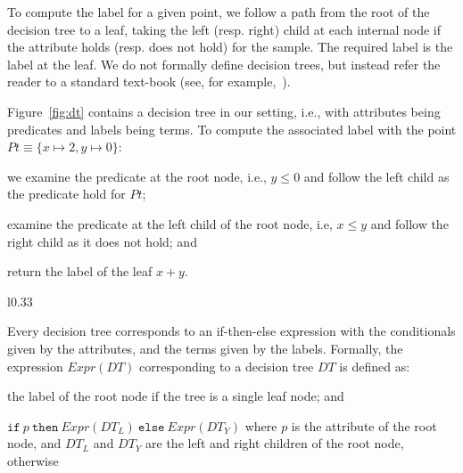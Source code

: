 \documentclass{llncs}
\newcommand\Point{\mathit{Pt}}
\newcommand\Pred{p}
\newcommand\ITE[3]{\mathtt{if}~#1~\mathtt{then}~#2~\mathtt{else}~#3}
\newcommand\DecisionTree{\mathit{DT}}
\newcommand\DTtoExpr[1]{\mathit{Expr}(#1)}
\newcommand\node{v}
\begin{document}
To compute the label for a given point, we follow a path from the root
of the decision tree to a leaf, taking the left (resp. right) child at
each internal node if the attribute holds (resp.  does not hold) for the
sample.
The required label is the label at the leaf.
We do not formally define decision trees, but instead refer the reader
to a standard text-book (see, for example,~\cite{bishop-book}).

\begin{example}
  Figure~\ref{fig:dt} contains a decision tree in our setting, i.e.,
  with attributes being predicates and labels being terms.
  To compute the associated label with the point $\Point \equiv \{ x
  \mapsto 2, y \mapsto 0 \}$:
  \begin{inparaenum}[(a)]
  \item we examine the predicate at the root node, i.e., $y \leq 0$ and
    follow the left child as the predicate hold for $\Point$;
  \item examine the predicate at the left child of the root node, i.e,
    $x \leq y$ and follow the right child as it does not hold; and
  \item return the label of the leaf $x + y$.
  \end{inparaenum}
\end{example}

\begin{wrapfigure}{l}{0.33\textwidth}
  \caption{Sample decision tree}
  \label{fig:dt}
\end{wrapfigure}
Every decision tree corresponds to an if-then-else expression with the
conditionals given by the attributes, and the terms given by the labels.
Formally, the expression $\DTtoExpr{\DecisionTree}$ corresponding to a
decision tree $\DecisionTree$ is defined as:
\begin{inparaenum}[(a)]
\item the label of the root node if the tree is a single leaf node; and
\item
  $\ITE{\Pred}{\DTtoExpr{\DecisionTree_L}}{\DTtoExpr{\DecisionTree_Y}}$
  where $\Pred$ is the attribute of the root node, and $\DecisionTree_L$ and
  $\DecisionTree_Y$ are the left and right children of the root node,
  otherwise
\end{inparaenum}
\end{document}
